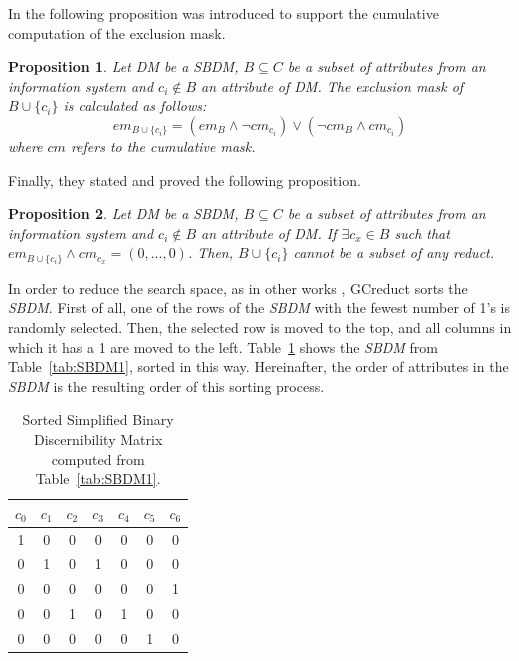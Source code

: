 \documentclass[number,preprint,review,12pt]{elsarticle}
\newtheorem{proposition}{Proposition}
\begin{document}
	In \cite{Lias13} the following proposition was introduced to support the cumulative computation of the exclusion mask.
	
	\begin{proposition}\label{prop:cumul} 
		Let DM be a SBDM, $B \subseteq C$ be a subset of attributes from an information system and $c_i \notin B$ an attribute of DM. The exclusion mask of $B \cup \lbrace c_i\rbrace$ is calculated as follows: $$em_{B \cup \lbrace c_i\rbrace}=(em_B \wedge \neg cm_{c_i}) \vee (\neg cm_B \wedge cm_{c_i})$$	where $cm$ refers to the cumulative mask.
	\end{proposition}
	
	Finally, they stated and proved the following proposition.
	
	\begin{proposition}\label{prop:exclude} 
		Let DM be a SBDM, $B \subseteq C$ be a subset of attributes from an information system and $c_i \notin B$ an attribute of DM. If $\exists c_x \in B$ such that $em_{B \cup \lbrace c_i\rbrace} \wedge cm_{c_x}=(0,...,0)$. Then, $B \cup \lbrace c_i\rbrace$ cannot be a subset of any reduct.
	\end{proposition}
	
	In order to reduce the search space, as in other works \citep{Sanchez07,Lias13}, GCreduct sorts the \textit{SBDM}. First of all, one of the rows of the \textit{SBDM} with the fewest number of 1's is randomly selected. Then, the selected row is moved to the top, and all columns in which it has a 1 are moved to the left. Table~\ref{tab:SSBDM1} shows the \textit{SBDM} from Table~\ref{tab:SBDM1}, sorted in this way. Hereinafter, the order of attributes in the \textit{SBDM} is the resulting order of this sorting process.
			
	\begin{table}[htb]
		\caption{Sorted Simplified Binary Discernibility Matrix computed from Table~\ref{tab:SBDM1}.}
		\centering
		\begin{tabular}{ccccccc}\label{tab:SSBDM1}
			$c_0$ & $c_1$ & $c_2$ & $c_3$ & $c_4$ & $c_5$ & $c_6$\\
			\hline
			1&0&0&0&0&0&0\\
			0&1&0&1&0&0&0\\
			0&0&0&0&0&0&1\\
			0&0&1&0&1&0&0\\
			0&0&0&0&0&1&0\\
		\end{tabular}             
	\end{table}  
	
\end{document}
